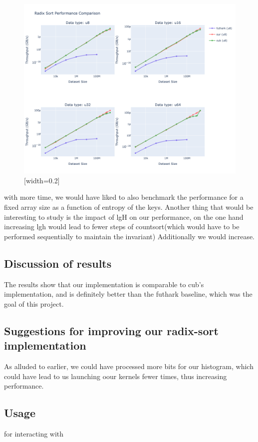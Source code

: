 \documentclass{article}
\begin{document}
\begin{figure}[h]
  \includegraphics{images/combined_benchmarks.png}[width=0.2]
\end{figure}

with more time, we would have liked to also benchmark the performance for a fixed array size as a function of entropy of the keys.
Another thing that would be interesting to study is the impact of lgH on our performance, on the one hand increasing lgh would lead to fewer steps of countsort(which would have to be performed sequentially to maintain the invariant)
Additionally we would increase.


\subsection{Discussion of results}
The results show that our implementation is comparable to cub's implementation, and is definitely better than the futhark baseline, which was the goal of this project.

\subsection{Suggestions for improving our radix-sort implementation}
As alluded to earlier, we could have processed more bits for our histogram, which could have lead to us launching oour kernels fewer times, thus increasing performance.

\subsection{Usage}

for interacting with 



\end{document}
